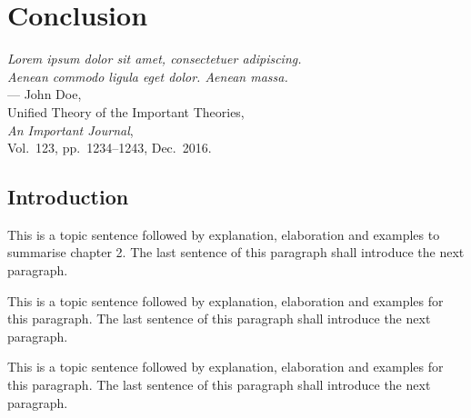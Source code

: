 

%
%
\chapter{Conclusion}
\label{ch:conclusion}

\begin{flushright}
{\slshape Lorem ipsum dolor sit amet, consectetuer adipiscing.}\\
{\slshape Aenean commodo ligula eget dolor. Aenean massa.}\\
\medskip
--- John Doe,\\
Unified Theory of the Important Theories,\\
{\slshape An Important Journal},\\
Vol.~123, pp.~1234--1243, Dec.~2016.\\
\end{flushright}

\bigskip

\section{Introduction}
\label{sec:ch_6_introduction}

This is a topic sentence followed by explanation, elaboration and examples to summarise chapter 2. The last sentence of this paragraph shall introduce the next paragraph. \lipsum[1]

This is a topic sentence followed by explanation, elaboration and examples for this paragraph. The last sentence of this paragraph shall introduce the next paragraph. \lipsum[1]

This is a topic sentence followed by explanation, elaboration and examples for this paragraph. The last sentence of this paragraph shall introduce the next paragraph. \lipsum[1]

